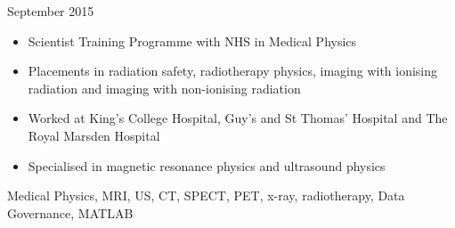 \begin{experiences}
    {September 2015}    {
                      \begin{itemize}
                        \item Scientist Training Programme with NHS in Medical Physics
                          \item Placements in radiation safety, radiotherapy physics, imaging with ionising radiation and
                          imaging with non-ionising radiation
                        \item Worked at King's College Hospital, Guy's and St Thomas' Hospital and The Royal Marsden Hospital
                          \item Specialised in magnetic resonance physics and ultrasound physics
                      \end{itemize}
                    }
                    {Medical Physics, MRI, US, CT, SPECT, PET, x-ray, radiotherapy, Data Governance, MATLAB}
%

\end{experiences}
